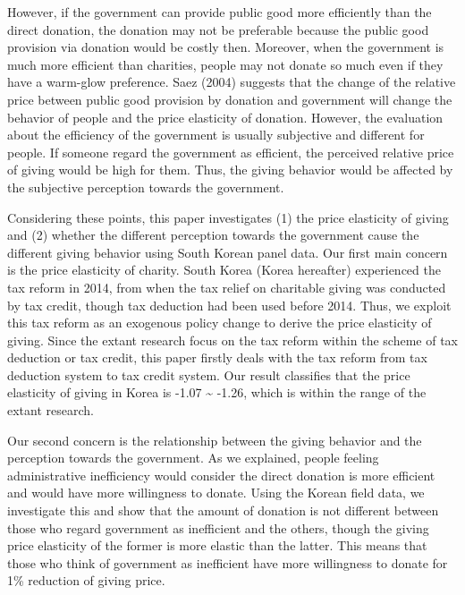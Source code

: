 \documentclass[ review  , 3p ]{elsarticle}
\begin{document}
  However, if the government can provide public good more efficiently than the direct donation, the donation may not be preferable because the public good provision via donation would be costly then.
  Moreover, when the government is much more efficient than charities, people may not donate so much even if they have a warm-glow preference. Saez (2004) suggests that the change of the relative price between public good provision by donation and government will change the behavior of people and the price elasticity of donation.
  However, the evaluation about the efficiency of the government is usually subjective and different for people. If someone regard the government as efficient, the perceived relative price of giving would be high for them. Thus, the giving behavior would be affected by the subjective perception towards the government.

  Considering these points, this paper investigates (1) the price elasticity of giving and (2) whether the different perception towards the government cause the different giving behavior using South Korean panel data.
  Our first main concern is the price elasticity of charity. South Korea (Korea hereafter) experienced the tax reform in 2014, from when the tax relief on charitable giving was conducted by tax credit, though tax deduction had been used before 2014. Thus, we exploit this tax reform as an exogenous policy change to derive the price elasticity of giving. Since the extant research focus on the tax reform within the scheme of tax deduction or tax credit, this paper firstly deals with the tax reform from tax deduction system to tax credit system.
  Our result classifies that the price elasticity of giving in Korea is -1.07 \textasciitilde{} -1.26, which is within the range of the extant research.

  Our second concern is the relationship between the giving behavior and the perception towards the government. As we explained, people feeling administrative inefficiency would consider the direct donation is more efficient and would have more willingness to donate. Using the Korean field data, we investigate this and show that the amount of donation is not different between those who regard government as inefficient and the others, though the giving price elasticity of the former is more elastic than the latter. This means that those who think of government as inefficient have more willingness to donate for 1\% reduction of giving price.
\end{document}
